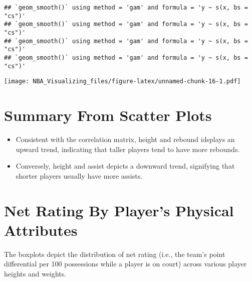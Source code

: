 \documentclass[
]{book}
\providecommand{\tightlist}{%
  \setlength{\itemsep}{0pt}\setlength{\parskip}{0pt}}
\begin{document}
\begin{verbatim}
## `geom_smooth()` using method = 'gam' and formula = 'y ~ s(x, bs = "cs")'
## `geom_smooth()` using method = 'gam' and formula = 'y ~ s(x, bs = "cs")'
## `geom_smooth()` using method = 'gam' and formula = 'y ~ s(x, bs = "cs")'
## `geom_smooth()` using method = 'gam' and formula = 'y ~ s(x, bs = "cs")'
\end{verbatim}

\texttt{[image: NBA\_Visualizing\_files/figure-latex/unnamed-chunk-16-1.pdf]}

\hypertarget{summary-from-scatter-plots}{%
\section{Summary From Scatter Plots}\label{summary-from-scatter-plots}}

\begin{itemize}
\tightlist
\item
  Consistent with the correlation matrix, height and rebound idsplays an upward trend, indicating that taller players tend to have more rebounds.
\item
  Conversely, height and assist depicts a downward trend, signifying that shorter players usually have more assists.
\end{itemize}

\hypertarget{net-rating-by-players-physical-attributes}{%
\section{Net Rating By Player's Physical Attributes}\label{net-rating-by-players-physical-attributes}}

The boxplots depict the distribution of net rating (i.e., the team's point differential per 100 possessions while a player is on court) across various player heights and weights.
\end{document}
